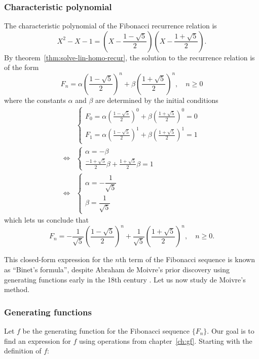 \documentclass[a4paper, 12pt]{report}
\begin{document}
\subsubsection{Characteristic polynomial}
The characteristic polynomial of the Fibonacci recurrence relation is
\[X^2 - X - 1 = \left(X - \frac{1 - \sqrt{5}}{2}\right)
                \left(X - \frac{1 + \sqrt{5}}{2}\right).
\]
By theorem~\ref{thm:solve-lin-homo-recur}, the solution to the recurrence relation is of the form 
\[F_n = \alpha \left(\frac{1 - \sqrt{5}}{2}\right)^n + \beta \left(\frac{1 + \sqrt{5}}{2}\right)^n, \quad n \geq 0\]
where the constants $\alpha$ and $\beta$ are determined by the initial conditions
\begin{align*}
    &\begin{cases}
    F_0 = \alpha \left(\frac{1 - \sqrt{5}}{2}\right)^0 + \beta \left(\frac{1 + \sqrt{5}}{2}\right)^0 = 0\\
    F_1 = \alpha \left(\frac{1 - \sqrt{5}}{2}\right)^1 + \beta \left(\frac{1 + \sqrt{5}}{2}\right)^1 = 1
    \end{cases}\\
    \iff &\begin{cases}
    \alpha = -\beta\\
    \frac{-1 + \sqrt{5}}{2} \beta + \frac{1 + \sqrt{5}}{2} \beta = 1
    \end{cases}\tag{*}\label{eq:rec-constants}\\
    \iff &\begin{cases}
    \alpha = -\dfrac{1}{\sqrt{5}}\\
    \beta = \dfrac{1}{\sqrt{5}}
    \end{cases}
\end{align*}
which lets us conclude that
\[F_n = -\frac{1}{\sqrt{5}} \left(\frac{1 - \sqrt{5}}{2}\right)^n + \frac{1}{\sqrt{5}} \left(\frac{1 + \sqrt{5}}{2}\right)^n, \quad n \geq 0.\]

This closed-form expression for the $n$th term of the Fibonacci sequence is known as ``Binet's formula'', despite Abraham de Moivre's prior discovery using generating functions early in the 18th century \autocite[83]{knuth}. Let us now study de Moivre's method.

\subsubsection{Generating functions}
Let $f$ be the generating function for the Fibonacci sequence $\{F_n\}$. Our goal is to find an expression for $f$ using operations from chapter~\ref{ch:gf}. Starting with the definition of $f$:
\end{document}
